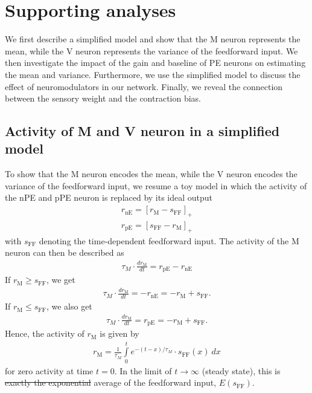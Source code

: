 \documentclass[10pt,a4paper]{article}
\providecommand{\DIFaddtex}[1]{{\protect\color{blue}\uwave{#1}}} %
\providecommand{\DIFdeltex}[1]{{\protect\color{red}\sout{#1}}}                      %
\providecommand{\DIFaddbegin}{} %
\providecommand{\DIFaddend}{} %
\providecommand{\DIFdelbegin}{} %
\providecommand{\DIFdelend}{} %
\providecommand{\DIFadd}[1]{\texorpdfstring{\DIFaddtex{#1}}{#1}} %
\providecommand{\DIFdel}[1]{\texorpdfstring{\DIFdeltex{#1}}{}} %
\newcommand{\DIFscaledelfig}{0.5}
\newlength{\DIFdelgraphicswidth} %
\newlength{\DIFdelgraphicsheight} %
\newcommand{\DIFaddincludegraphics}[2][]{{\color{blue}\fbox{\DIFOincludegraphics[#1]{#2}}}} %
\newcommand{\DIFdelincludegraphics}[2][]{%
\sbox{\DIFdelgraphicsbox}{\DIFOincludegraphics[#1]{#2}}%
\settoboxwidth{\DIFdelgraphicswidth}{\DIFdelgraphicsbox} %
\settoboxtotalheight{\DIFdelgraphicsheight}{\DIFdelgraphicsbox} %
\scalebox{\DIFscaledelfig}{%
\parbox[b]{\DIFdelgraphicswidth}{\usebox{\DIFdelgraphicsbox}\\[-\baselineskip] \rule{\DIFdelgraphicswidth}{0em}}\llap{\resizebox{\DIFdelgraphicswidth}{\DIFdelgraphicsheight}{%
\setlength{\unitlength}{\DIFdelgraphicswidth}%
\begin{picture}(1,1)%
\thicklines\linethickness{2pt} %
{\color[rgb]{1,0,0}\put(0,0){\framebox(1,1){}}}%
{\color[rgb]{1,0,0}\put(0,0){\line( 1,1){1}}}%
{\color[rgb]{1,0,0}\put(0,1){\line(1,-1){1}}}%
\end{picture}%
}\hspace*{3pt}}} %
} %
\DeclareRobustCommand{\DIFaddbegin}{\DIFOaddbegin \let\includegraphics\DIFaddincludegraphics} %
\DeclareRobustCommand{\DIFaddend}{\DIFOaddend \let\includegraphics\DIFOincludegraphics} %
\DeclareRobustCommand{\DIFdelbegin}{\DIFOdelbegin \let\includegraphics\DIFdelincludegraphics} %
\DeclareRobustCommand{\DIFdelend}{\DIFOaddend \let\includegraphics\DIFOincludegraphics} %
\begin{document}
\section{Supporting analyses}

We first describe a simplified model and show that the M neuron represents the mean, while the V neuron represents the variance of the feedforward input. We then investigate the impact of the gain and baseline of PE neurons on estimating the mean and variance. Furthermore, we use the simplified model to discuss the effect of neuromodulators in our network. Finally, we reveal the connection between the sensory weight and the contraction bias.

\subsection{Activity of M and V neuron in a simplified model}\label{sec:toy}
%
To show that the M neuron encodes the mean, while the V neuron encodes the variance of the feedforward input, we resume a toy model in which the activity of the nPE and pPE neuron is replaced by its ideal output
%
\begin{align}
r_\mathrm{nE} = \left[ r_\mathrm{M} - s_\mathrm{FF}\right]_+ \nonumber \\
r_\mathrm{pE} = \left[ s_\mathrm{FF} - r_\mathrm{M} \right]_+
\end{align}
%
with $s_\mathrm{FF}$ denoting the time-dependent feedforward input. The activity of the M neuron can then be described as
%
\begin{align}
\tau_M \cdot \frac{dr_\mathrm{M}}{dt} = r_\mathrm{pE} - r_\mathrm{nE}
\end{align}
%
If $r_\mathrm{M} \geq s_\mathrm{FF}$, we get
%
\begin{align}
\tau_M \cdot \frac{dr_\mathrm{M}}{dt} = -r_\mathrm{nE} = -r_\mathrm{M} + s_\mathrm{FF}.
\end{align}
%
If $r_\mathrm{M} \leq s_\mathrm{FF}$, we also get
%
\begin{align}
\tau_M \cdot \frac{dr_\mathrm{M}}{dt} = r_\mathrm{pE} = -r_\mathrm{M} + s_\mathrm{FF}.\nonumber
\end{align}
%
Hence, the activity of $r_\mathrm{M}$ is given by
%
\begin{align}
r_\mathrm{M} = \frac{1}{\tau_M} \int\limits_0^t e^{-(t-x)/\tau_M}\cdot s_\mathrm{FF}(x)\ dx
\end{align}  
%
for zero activity at time $t=0$. In the limit of $t\rightarrow \infty$ (steady state), this is \DIFdelbegin \DIFdel{exactly the exponential }\DIFdelend \DIFaddbegin \DIFadd{the exponential moving }\DIFaddend average of the feedforward input, $E(s_\mathrm{FF})$.
\end{document}
